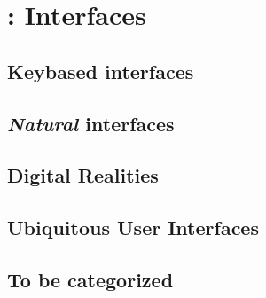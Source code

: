 \section{\todo : Interfaces}



\subsection{Keybased interfaces}






\subsection{\emph{Natural} interfaces}






\subsection{Digital Realities}




\subsection{Ubiquitous User Interfaces}  




\subsection{To be categorized}
\todo







